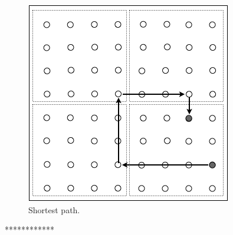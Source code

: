 \begin{itemize}
{\begin{figure}[hbt]
\begin{center}
       \includegraphics[scale=0.4]{FiguresGraph/routingCity3}
       \caption{Shortest path.}
\end{center}
\end{figure}
************}

\end{itemize}


